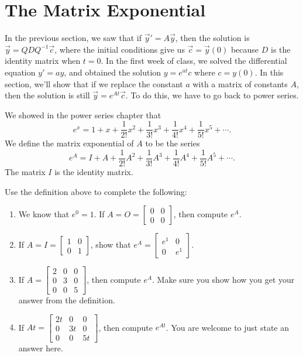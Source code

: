 \section{The Matrix Exponential}
In the previous section, we saw that if $\vec y' = A\vec y$, then the solution is $\vec y = QDQ^{-1}\vec c$, where the initial conditions give us $\vec c = \vec y(0)$ because $D$ is the identity matrix when $t=0$.  In the first week of class, we solved the differential equation $y'=ay$, and obtained the solution $y=e^{at}c$ where $c=y(0)$.  In this section, we'll show that if we replace the constant $a$ with a matrix of constants $A$, then the solution is still $\vec y=e^{At}\vec c$. To do this, we have to go back to power series. 

\begin{definition}
 We showed in the power series chapter that 
$$e^x = 1+x+\frac{1}{2!}x^2+\frac{1}{3!}x^3+\frac{1}{4!}x^4+\frac{1}{5!}x^5+\cdots.$$
We define the matrix exponential of $A$ to be the series
$$e^A = I+A+\frac{1}{2!}A^2+\frac{1}{3!}A^3+\frac{1}{4!}A^4+\frac{1}{5!}A^5+\cdots.$$
The matrix $I$ is the identity matrix.
\end{definition}


\begin{problem}
 Use the definition above to complete the following:
\begin{enumerate}
 \item 
{}%
We know that $e^0=1$. If $A=O=\begin{bmatrix}0&0\\0&0\end{bmatrix}$, then compute $e^{A}$.
 \item If $A=I=\begin{bmatrix}1&0\\0&1\end{bmatrix}$, show that $e^{A}=\begin{bmatrix}e^1&0\\0&e^1\end{bmatrix}$.
 \item If $A=\begin{bmatrix}2&0&0\\0&3&0\\0&0&5\end{bmatrix}$, then compute $e^A$. Make sure you show how you get your answer from the definition.
 \item If $At=\begin{bmatrix}2t&0&0\\0&3t&0\\0&0&5t\end{bmatrix}$, then compute $e^{At}$. You are welcome to just state an answer here. 
\end{enumerate}
\end{problem}

